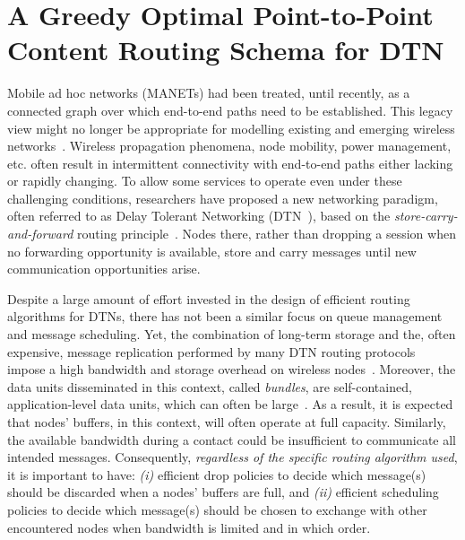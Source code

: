 \chapter{A Greedy Optimal Point-to-Point Content Routing Schema for DTN}
\label{chapter:ptp}
\minitoc

Mobile ad hoc networks (MANETs) had been treated, until recently, as a connected graph over which
end-to-end paths need to be established. This legacy view might no longer be appropriate for modelling existing and emerging wireless networks~\cite{Fall:DTNrouting,Fall:Sigcomm05,Glance:pollen}. Wireless propagation phenomena, node mobility, power management, etc. often result in intermittent connectivity with end-to-end paths either lacking or rapidly changing. To allow some services to operate even under these challenging conditions, researchers have proposed a new networking paradigm, often referred to as Delay Tolerant Networking (DTN~\cite{dtnrg}), based on the \emph{store-carry-and-forward} routing principle~\cite{Fall:DTNrouting}. Nodes there, rather than dropping a session when no forwarding opportunity is available, store and carry messages until new communication opportunities arise.

Despite a large amount of effort invested in the design of efficient routing algorithms for DTNs, there has not been a similar focus on queue management and message scheduling. Yet, the combination of long-term storage and the, often expensive, message replication performed by many DTN routing protocols~\cite{Vahdat:epidemic,Lindgren:probabilistic} impose a high bandwidth and storage overhead on wireless
nodes~\cite{akis:ton-multi}. Moreover, the data units disseminated in this context, called \emph{bundles}, are self-contained, application-level data units, which can often be large~\cite{dtnrg}. As a result, it is expected that nodes' buffers, in this context, will often operate at full capacity. Similarly, the available bandwidth during a contact could be insufficient to communicate all intended messages. Consequently, \emph{regardless of the specific routing algorithm used}, it is important to have: \emph{(i)} efficient drop policies to decide which message(s) should be discarded when a nodes' buffers are full, and \emph{(ii)} efficient scheduling policies to decide which message(s) should be chosen to exchange with other encountered nodes when bandwidth is limited and in which order.

